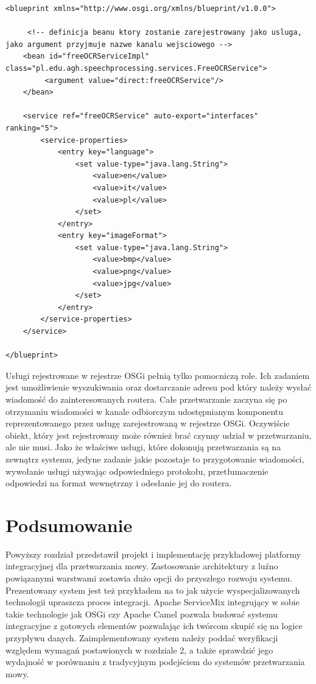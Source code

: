 \lstset{language=XML, tabsize=4, caption=Definicja usługi OCR przy użyciu kontenera Blueprint.,label=lst:blueprint_definition}

\begin{center}
\begin{lstlisting}
<blueprint xmlns="http://www.osgi.org/xmlns/blueprint/v1.0.0">

	 <!-- definicja beanu ktory zostanie zarejestrowany jako usluga, jako argument przyjmuje nazwe kanalu wejsciowego -->
	<bean id="freeOCRServiceImpl" class="pl.edu.agh.speechprocessing.services.FreeOCRService">
		 <argument value="direct:freeOCRService"/> 
	</bean>

	<service ref="freeOCRService" auto-export="interfaces" ranking="5">
		<service-properties>
			<entry key="language">
				<set value-type="java.lang.String">
					<value>en</value>
					<value>it</value>
					<value>pl</value>
				</set> 
			</entry>
			<entry key="imageFormat">
				<set value-type="java.lang.String">
					<value>bmp</value>
					<value>png</value>
					<value>jpg</value>
				</set> 
			</entry>
		</service-properties>
	</service>

</blueprint>

\end{lstlisting}
\end{center}

Usługi rejestrowane w rejestrze OSGi pełnią tylko pomocniczą role. Ich zadaniem jest umożliwienie wyszukiwania oraz dostarczanie adresu pod który należy wysłać wiadomość do zainteresowanych routera. Całe przetwarzanie zaczyna się po otrzymaniu wiadomości w kanale odbiorczym udostępnianym komponentu reprezentowanego przez usługę zarejestrowaną w rejestrze OSGi. Oczywiście obiekt, który jest rejestrowany może również brać czynny udział w przetwarzaniu, ale nie musi. Jako że właściwe usługi, które dokonują przetwarzania są na zewnątrz systemu, jedyne zadanie jakie pozostaje to przygotowanie wiadomości, wywołanie usługi używając odpowiedniego protokołu, przetłumaczenie odpowiedzi na format wewnętrzny i odesłanie jej do routera. 



\section*{Podsumowanie} 

Powyższy rozdział przedstawił projekt i implementację przykładowej platformy integracyjnej dla przetwarzania mowy. Zastosowanie architektury z luźno powiązanymi warstwami zostawia dużo opcji do przyszłego rozwoju systemu. Prezentowany system jest też przykładem na to jak użycie wyspecjalizowanych technologii upraszcza proces integracji. Apache ServiceMix integrujący w sobie takie technologie jak OSGi czy Apache Camel pozwala budować systemu integracyjne z gotowych elementów pozwalając ich twórcom skupić się na logice przypływu danych. Zaimplementowany system należy poddać weryfikacji względem wymagań postawionych w rozdziale 2, a także sprawdzić jego wydajność w porównaniu z tradycyjnym podejściem do systemów przetwarzania mowy.


